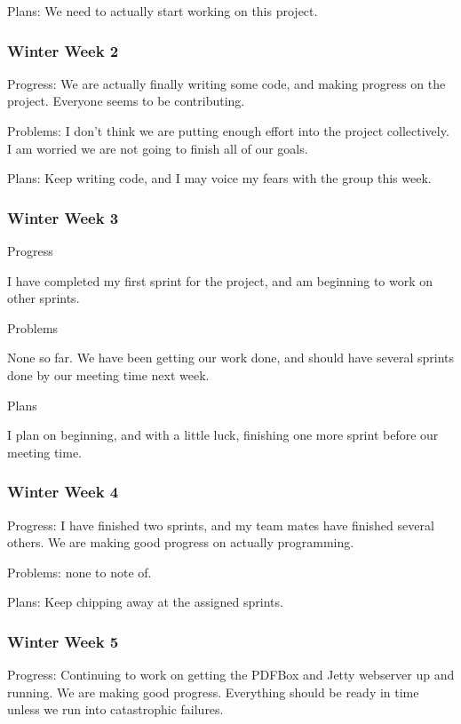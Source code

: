 \documentclass[onecolumn, draftclsnofoot,10pt, compsoc]{IEEEtran}
\begin{document}
Plans: We need to actually start working on this project. 

\subsubsection*{Winter Week 2}

Progress: We are actually finally writing some code, and making progress on the project. Everyone seems to be contributing.

Problems: I don't think we are putting enough effort into the project collectively. I am worried we are not going to finish all of our goals.

Plans: Keep writing code, and I may voice my fears with the group this week.

\subsubsection*{Winter Week 3}

Progress

I have completed my first sprint for the project, and am beginning to work on other sprints.

Problems

None so far. We have been getting our work done, and should have several sprints done by our meeting time next week.

Plans

I plan on beginning, and with a little luck, finishing one more sprint before our meeting time.

\subsubsection*{Winter Week 4}

Progress: I have finished two sprints, and my team mates have finished several others. We are making good progress on actually programming.

Problems: none to note of.

Plans: Keep chipping away at the assigned sprints.

\subsubsection*{Winter Week 5}

Progress: Continuing to work on getting the PDFBox and Jetty webserver up and running. We are making good progress. Everything should be ready in time unless we run into catastrophic failures.
\end{document}
